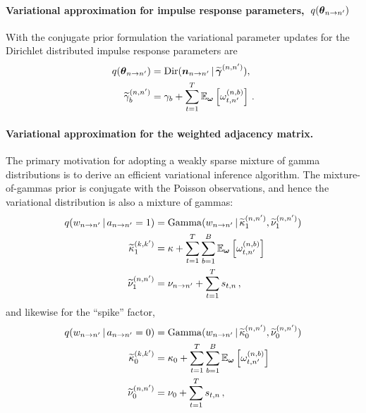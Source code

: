 \paragraph{Variational approximation for impulse response parameters,~$q(\boldsymbol{\theta}_{n \to n'})$}
With the conjugate prior formulation the variational parameter updates
for the Dirichlet distributed impulse response parameters are
\begin{align*}
q(\boldsymbol{\theta}_{n \to n'}) &= \mathrm{Dir}(\boldsymbol{n}_{n \to n'} \,|\, \widetilde{\boldsymbol{\gamma}}^{(n,n')}), \\
\widetilde{\gamma}_b^{(n,n')} &= \gamma_{b} + \sum_{t=1}^T \mathbb{E}_{\boldsymbol{\omega}}\left[\omega_{t,n'}^{(n,b)}\right]\,.
\end{align*}

\paragraph{Variational approximation for the weighted adjacency matrix.}
The primary motivation for adopting a weakly sparse mixture of gamma
distributions is to derive an efficient variational inference
algorithm.  The mixture-of-gammas prior is conjugate with the Poisson
observations, and hence the variational distribution is also a mixture
of gammas:
\begin{align*}
  q(w_{n \to n'} \,|\, a_{n \to n'}=1)
  &= \mathrm{Gamma}(w_{n \to n'} \,|\,
  \widetilde{\kappa}^{(n,n')}_1,
  \widetilde{\nu}^{(n,n')}_1) \\
  \widetilde{\kappa}^{(k,k')}_1
  &= \kappa + \sum_{t=1}^T \sum_{b=1}^B \mathbb{E}_{\boldsymbol{\omega}}\left[\omega_{t,n'}^{(n,b)}\right] \\
  \widetilde{\nu}^{(n,n')}_1
  &= \nu_{n \to n'} + \sum_{t=1}^T s_{t,n}\,,
\end{align*}
and likewise for the ``spike'' factor,
\begin{align*}
  q(w_{n \to n'} \,|\, a_{n \to n'}=0)
  &= \mathrm{Gamma}(w_{n \to n'} \,|\,
  \widetilde{\kappa}^{(n,n')}_0,
  \widetilde{\nu}^{(n,n')}_0) \\
  \widetilde{\kappa}^{(k,k')}_0
  &= \kappa_0 + \sum_{t=1}^T \sum_{b=1}^B \mathbb{E}_{\boldsymbol{\omega}}\left[\omega_{t,n'}^{(n,b)}\right] \\
  \widetilde{\nu}^{(n,n')}_0
  &= \nu_0 + \sum_{t=1}^T s_{t,n}\,,
\end{align*}

